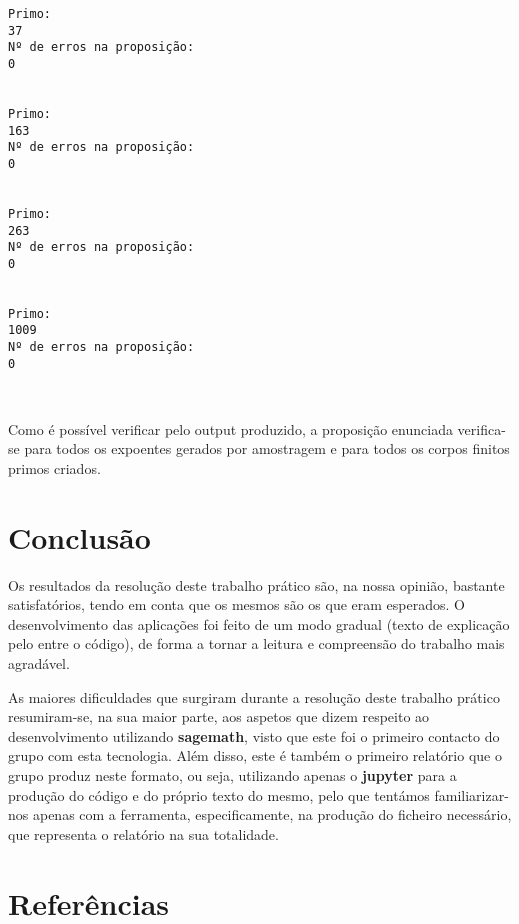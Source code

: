 \documentclass[11pt]{article}
\begin{document}
    \begin{Verbatim}[commandchars=\\\{\}]
Primo:
37
Nº de erros na proposição:
0


Primo:
163
Nº de erros na proposição:
0


Primo:
263
Nº de erros na proposição:
0


Primo:
1009
Nº de erros na proposição:
0



    \end{Verbatim}

    Como é possível verificar pelo output produzido, a proposição enunciada
verifica-se para todos os expoentes gerados por amostragem e para todos
os corpos finitos primos criados.

    \hypertarget{conclusuxe3o}{%
\section{Conclusão}\label{conclusuxe3o}}

    Os resultados da resolução deste trabalho prático são, na nossa opinião,
bastante satisfatórios, tendo em conta que os mesmos são os que eram
esperados. O desenvolvimento das aplicações foi feito de um modo gradual
(texto de explicação pelo entre o código), de forma a tornar a leitura e
compreensão do trabalho mais agradável.

As maiores dificuldades que surgiram durante a resolução deste trabalho
prático resumiram-se, na sua maior parte, aos aspetos que dizem respeito
ao desenvolvimento utilizando \textbf{sagemath}, visto que este foi o
primeiro contacto do grupo com esta tecnologia. Além disso, este é
também o primeiro relatório que o grupo produz neste formato, ou seja,
utilizando apenas o \textbf{jupyter} para a produção do código e do
próprio texto do mesmo, pelo que tentámos familiarizar-nos apenas com a
ferramenta, especificamente, na produção do ficheiro necessário, que
representa o relatório na sua totalidade.

    \hypertarget{referuxeancias}{%
\section{Referências}\label{referuxeancias}}
\end{document}
